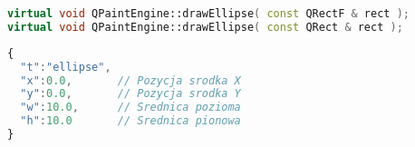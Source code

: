 \begin{lstlisting}[language=C++,numbers=none]
virtual void QPaintEngine::drawEllipse( const QRectF & rect );
virtual void QPaintEngine::drawEllipse( const QRect & rect );
\end{lstlisting}
\begin{lstlisting}[language=JavaScript,numbers=none]
{
  "t":"ellipse",
  "x":0.0,       // Pozycja srodka X
  "y":0.0,       // Pozycja srodka Y
  "w":10.0,      // Srednica pozioma
  "h":10.0       // Srednica pionowa
}
\end{lstlisting}
